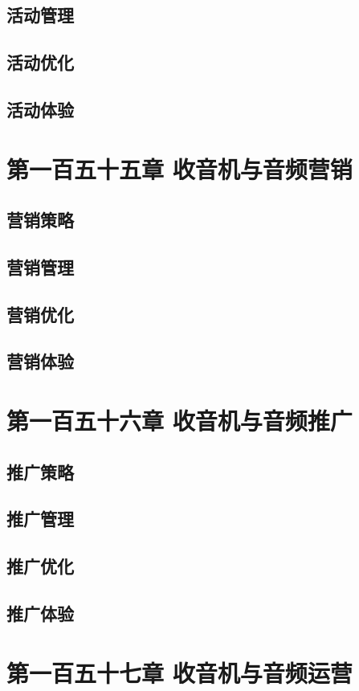 \documentclass[12pt,UTF8]{ctexbook}
\begin{document}
\section{活动管理}
\section{活动优化}
\section{活动体验}

\chapter{第一百五十五章 收音机与音频营销}

\section{营销策略}
\section{营销管理}
\section{营销优化}
\section{营销体验}

\chapter{第一百五十六章 收音机与音频推广}

\section{推广策略}
\section{推广管理}
\section{推广优化}
\section{推广体验}

\chapter{第一百五十七章 收音机与音频运营}
\end{document}
